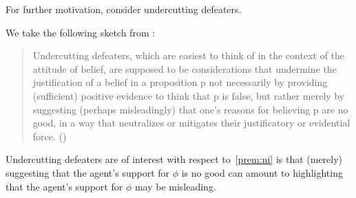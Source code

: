 \documentclass[10pt]{article}
\begin{document}
\begin{note}
  For further motivation, consider undercutting defeaters.

  We take the following sketch from \textcite{Worsnip:2018aa}:
  \begin{quote}
    Undercutting defeaters, which are easiest to think of in the context of the attitude of belief, are supposed to be considerations that undermine the justification of a belief in a proposition p not necessarily by providing (sufficient) positive evidence to think that p is false, but rather merely by suggesting (perhaps misleadingly) that one’s reasons for believing p are no good, in a way that neutralizes or mitigates their justificatory or evidential force.\nolinebreak
    \mbox{}\hfill\mbox{(\citeyear[29]{Worsnip:2018aa})}
  \end{quote}

  Undercutting defeaters are of interest with respect to~\ref{prem:ni} is that (merely) suggesting that the agent's support for \(\phi\) is no good can amount to highlighting that the agent's support for \(\phi\) may be misleading.


\end{note}
\end{document}
